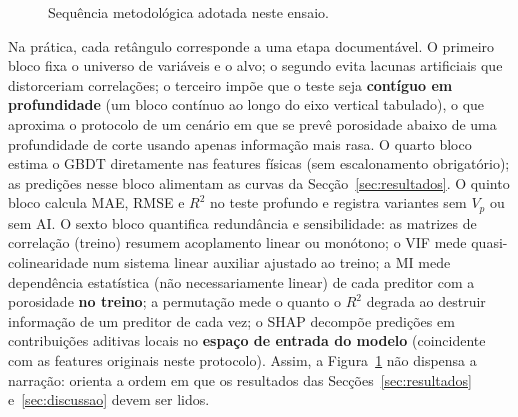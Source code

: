 \documentclass[12pt,a4paper]{article}
\begin{document}
\begin{figure}[h]
\centering
{}
\caption{Sequência metodológica adotada neste ensaio.}
\label{fig:fluxo}
\end{figure}

Na prática, cada retângulo corresponde a uma etapa documentável. O primeiro
bloco fixa o universo de variáveis e o alvo; o segundo evita lacunas artificiais
que distorceriam correlações; o terceiro impõe que o teste seja \textbf{contíguo em profundidade}
(um bloco contínuo ao longo do eixo vertical tabulado), o que aproxima o protocolo de um cenário em que se
prevê porosidade abaixo de uma profundidade de corte usando apenas informação
mais rasa. O quarto bloco estima o GBDT diretamente nas features físicas (sem
escalonamento obrigatório); as predições nesse bloco alimentam as curvas da
Secção~\ref{sec:resultados}. O quinto bloco calcula MAE, RMSE e \(R^2\) no teste
profundo e registra variantes sem \(V_p\) ou sem AI. O sexto bloco quantifica
redundância e sensibilidade: as matrizes de correlação (treino) resumem acoplamento
linear ou monótono; o VIF mede quasi-colinearidade num sistema linear auxiliar
ajustado ao treino; a
MI mede dependência estatística (não necessariamente linear) de cada preditor
com a porosidade \textbf{no treino}; a permutação mede o quanto o \(R^2\) degrada ao destruir
informação de um preditor de cada vez; o SHAP decompõe predições em
contribuições aditivas locais no \textbf{espaço de entrada do modelo} (coincidente com as
features originais neste protocolo). Assim, a Figura~\ref{fig:fluxo} não dispensa a
narração: orienta a ordem em que os resultados das Secções~\ref{sec:resultados}
e~\ref{sec:discussao} devem ser lidos.
\end{document}
